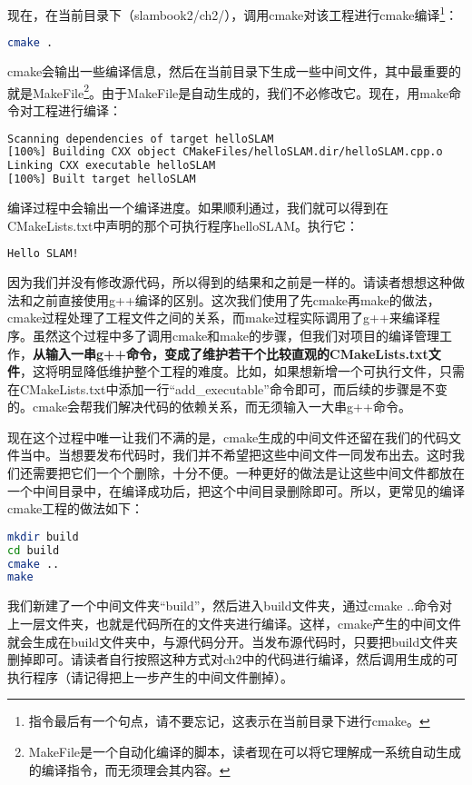 现在，在当前目录下（slambook2/ch2/），调用cmake对该工程进行cmake编译\footnote{指令最后有一个句点，请不要忘记，这表示在当前目录下进行cmake。}：

\begin{lstlisting}[language=sh,caption=终端输入：]
cmake .
\end{lstlisting}

cmake会输出一些编译信息，然后在当前目录下生成一些中间文件，其中最重要的就是MakeFile\footnote{MakeFile是一个自动化编译的脚本，读者现在可以将它理解成一系统自动生成的编译指令，而无须理会其内容。}。由于MakeFile是自动生成的，我们不必修改它。现在，用make命令对工程进行编译：
\begin{lstlisting}[language=sh,caption=终端输入：]
% make
Scanning dependencies of target helloSLAM
[100%] Building CXX object CMakeFiles/helloSLAM.dir/helloSLAM.cpp.o
Linking CXX executable helloSLAM
[100%] Built target helloSLAM
\end{lstlisting}

编译过程中会输出一个编译进度。如果顺利通过，我们就可以得到在CMakeLists.txt中声明的那个可执行程序helloSLAM。执行它：
\begin{lstlisting}[language=sh,caption=终端输入：]
% ./helloSLAM
Hello SLAM!
\end{lstlisting}

因为我们并没有修改源代码，所以得到的结果和之前是一样的。请读者想想这种做法和之前直接使用g++编译的区别。这次我们使用了先cmake再make的做法，cmake过程处理了工程文件之间的关系，而make过程实际调用了g++来编译程序。虽然这个过程中多了调用cmake和make的步骤，但我们对项目的编译管理工作，\textbf{从输入一串g++命令，变成了维护若干个比较直观的CMakeLists.txt文件}，这将明显降低维护整个工程的难度。比如，如果想新增一个可执行文件，只需在CMakeLists.txt中添加一行“add\_executable”命令即可，而后续的步骤是不变的。cmake会帮我们解决代码的依赖关系，而无须输入一大串g++命令。

现在这个过程中唯一让我们不满的是，cmake生成的中间文件还留在我们的代码文件当中。当想要发布代码时，我们并不希望把这些中间文件一同发布出去。这时我们还需要把它们一个个删除，十分不便。一种更好的做法是让这些中间文件都放在一个中间目录中，在编译成功后，把这个中间目录删除即可。所以，更常见的编译cmake工程的做法如下：

\begin{lstlisting}[language=sh,caption=终端输入：]
mkdir build
cd build
cmake ..
make
\end{lstlisting}

我们新建了一个中间文件夹“build”，然后进入build文件夹，通过cmake ..命令对上一层文件夹，也就是代码所在的文件夹进行编译。这样，cmake产生的中间文件就会生成在build文件夹中，与源代码分开。当发布源代码时，只要把build文件夹删掉即可。请读者自行按照这种方式对ch2中的代码进行编译，然后调用生成的可执行程序（请记得把上一步产生的中间文件删掉）。

